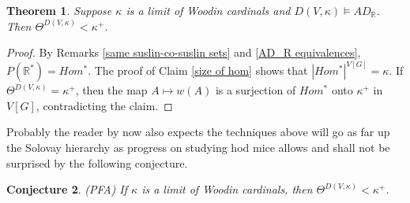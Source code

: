 \documentclass[12pt]{article}
\newtheorem{theorem}{Theorem}[section]
\newtheorem{conjecture}[theorem]{Conjecture}
\newcommand\R{\mathbb{R}}
\begin{document}
\begin{theorem}
\label{not adr}
    Suppose $\kappa$ is a limit of Woodin cardinals and $D(V,\kappa)\models AD_\R$. Then $\Theta^{D(V,\kappa)}<\kappa^+$.
\end{theorem}
\begin{proof}
    By Remarks \ref{same suslin-co-suslin sets} and \ref{AD_R equivalences}, $P(\R^*) = Hom^*$. The proof of Claim \ref{size of hom} shows that $|Hom^*|^{V[G]} = \kappa$. If $\Theta^{D(V,\kappa)} = \kappa^+$, then the map $A \mapsto w(A)$ is a surjection of $Hom^*$ onto $\kappa^+$ in $V[G]$, contradicting the claim.
\end{proof}

Probably the reader by now also expects the techniques above will go as far up the Solovay hierarchy as progress on studying hod mice allows and shall not be surprised by the following conjecture.

\begin{conjecture}
\label{theta conjecture}
    (PFA) If $\kappa$ is a limit of Woodin cardinals, then $\Theta^{D(V,\kappa)} < \kappa^+$.
\end{conjecture}

\printbibliography
\end{document}
